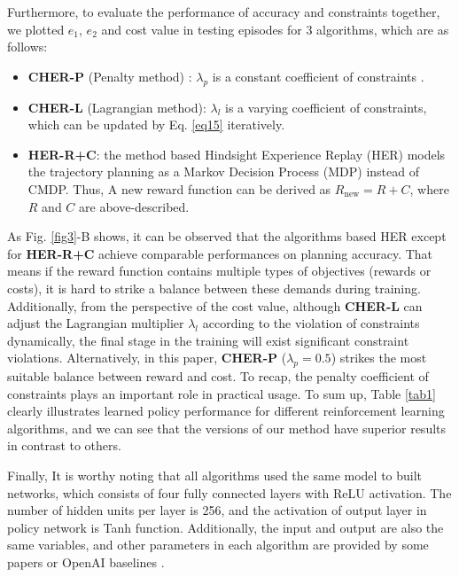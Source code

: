 \documentclass{article}
\begin{document}
Furthermore, to evaluate the performance of accuracy and constraints together, we plotted $e_1$, $e_2$ and cost value in testing episodes for 3 algorithms, which are as follows:
\begin{itemize}
    \item \textbf{CHER-P} (Penalty method) : $\lambda_p$ is a constant coefficient of constraints . 
    \item \textbf{CHER-L} (Lagrangian method): $\lambda_l$ is a varying coefficient of constraints, which can be updated by Eq. \eqref{eq15} iteratively.
    \item \textbf{HER-R+C}: the method based Hindsight Experience Replay (HER) models the trajectory planning as a Markov Decision Process (MDP) instead of CMDP. Thus, A new reward function can be derived as $R_{\text{new}}= R+C$, where $R$ and $C$ are above-described.
\end{itemize}
As Fig. \ref{fig3}-B shows, it can be observed that the algorithms based HER except for 
\textbf{HER-R+C} achieve comparable performances on planning accuracy. That means if the reward function contains multiple types of objectives (rewards or costs), it is hard to strike a balance between these demands during training. Additionally, from the perspective of the cost value, although \textbf{CHER-L} can adjust the Lagrangian multiplier $\lambda_l$ according to the violation of constraints dynamically, the final stage in the training will exist significant constraint violations. Alternatively, in this paper, \textbf{CHER-P} ($\lambda_p =0.5$) strikes the most suitable balance between reward and cost. To recap, the penalty coefficient of constraints plays an important role in practical usage. To sum up, Table \ref{tab1} clearly illustrates learned policy performance for different reinforcement learning algorithms, and we can see that the versions of our method have superior results in contrast to others. 


Finally, It is worthy noting that all algorithms used the same model to built networks, which consists of four fully connected layers with ReLU activation. The number of hidden units per layer is 256, and the activation of output layer in policy network is Tanh function. Additionally, the input and output are also the same variables, and other parameters in each algorithm are provided by some papers \cite{2020Reinforcement,Wang20221multi} or OpenAI baselines \cite{baselines}.
\end{document}
